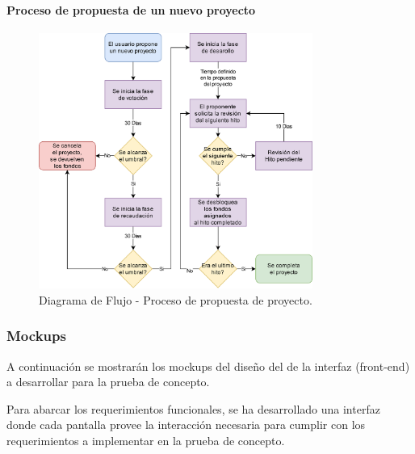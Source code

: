 \newpage

\paragraph{Proceso de propuesta de un nuevo proyecto}
\begin{figure}[H]
        \centering
        \includegraphics[width=0.8\textwidth]{img/diagramas/diagrama_flujo_proponente.png}
        \caption{Diagrama de Flujo - Proceso de propuesta de proyecto.}
        \label{fig:configApi}
\end{figure}

\newpage

\subsubsection{Mockups}

A continuación se mostrarán los mockups del diseño del de la interfaz (front-end) a desarrollar para la prueba de concepto.

\bigskip

Para abarcar los requerimientos funcionales, se ha desarrollado una interfaz donde cada pantalla provee la interacción necesaria para cumplir con los requerimientos a implementar en la prueba de concepto.

